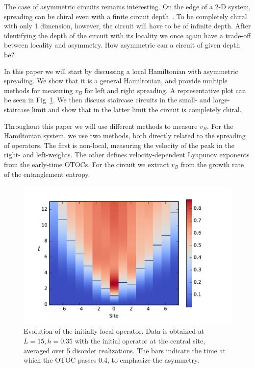 \documentclass[aps,prx,reprint,superscriptaddress, longbibliography]{revtex4-1}
\newcommand{\charlie}[1]{{\color{Magenta}{{#1}}}}
\begin{document}
The case of asymmetric circuits remains interesting. On the edge of a 2-D system, spreading can be chiral even with a finite circuit depth~\cite{PoChiralCircuit}. To be completely chiral with only 1 dimension, however, the circuit will have to be of infinite depth. After identifying the depth of the circuit with its locality \charlie{(how?)} we once again have a trade-off between locality and asymmetry. How asymmetric can a circuit of given depth be?

In this paper we will start by discussing a local Hamiltonian with asymmetric spreading. We show that it is a general Hamiltonian, and provide multiple methods for measuring $v_B$ for left and right spreading. A representative plot can be seen in Fig~\ref{fig:colorplot}. We then discuss staircase circuits in the small- and large-staircase limit and show that in the latter limit the circuit is completely chiral.

Throughout this paper we will use different methods to measure $v_B$. For the Hamiltonian system, we use two methods, both directly related to the spreading of operators. The first is non-local, measuring the velocity of the peak in the right- and left-weights. The other defines velocity-dependent Lyapunov exponents from the early-time OTOCs. For the circuit we extract $v_B$ from the growth rate of the entanglement entropy.

\begin{figure}
	\includegraphics[width=\columnwidth]{colorplot}
	\caption{Evolution of the initially local operator. Data is obtained at $L=15, h=0.35$ with the initial operator at the central site, averaged over 5 disorder realizations. The bars indicate the time at which the OTOC passes 0.4, to emphasize the asymmetry.}
	\label{fig:colorplot}
\end{figure}
\end{document}
